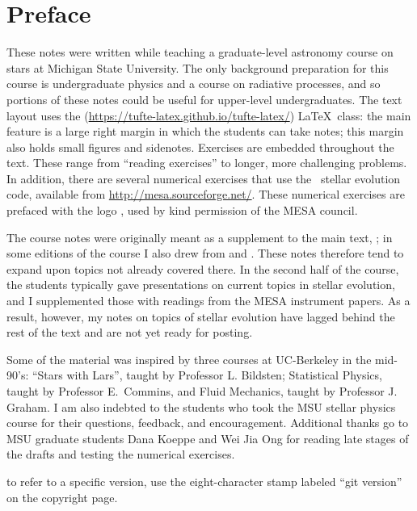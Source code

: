 
\section*{Preface}
These notes were written while teaching a graduate-level astronomy course on stars at Michigan State University.  The only background preparation for this course is undergraduate physics and a course on radiative processes, and so portions of these notes could be useful for upper-level undergraduates.  
The text layout uses the  (\url{https://tufte-latex.github.io/tufte-latex/}) \LaTeX\ class:  the main feature is a large right margin in which the students can take notes; this margin also holds small figures and sidenotes. Exercises are embedded throughout the text.  These range from ``reading exercises'' to longer, more challenging problems.  In addition, there are several numerical exercises that use the \mesa\ stellar evolution code, available from \url{http://mesa.sourceforge.net/}.  These numerical exercises are prefaced with the logo , used by kind permission of the MESA council.

The course notes were originally meant as a supplement to the main text, ; in some editions of the course I also drew from  and .  These notes therefore tend to expand upon topics not already covered there.  In the second half of the course, the students typically gave presentations on current topics in stellar evolution, and I supplemented those with readings from the MESA instrument papers\cite{Paxton2010Modules-for-Exp,Paxton2013Modules-for-Exp}.  As a result, however, my notes on topics of stellar evolution have lagged behind the rest of the text and are not yet ready for posting. 

Some of the material was inspired by three courses at UC-Berkeley in the mid-90's: ``Stars with Lars'', taught by Professor L. Bildsten; Statistical Physics, taught by Professor E.~Commins, and Fluid Mechanics, taught by Professor J. Graham.  I am also indebted to the students who took the MSU stellar physics course for their questions, feedback, and encouragement. Additional thanks go to MSU graduate students Dana Koeppe and Wei Jia Ong for reading late stages of the drafts and testing the numerical exercises.

 to refer to a specific version, use the eight-character stamp labeled ``git version'' on the copyright page.
